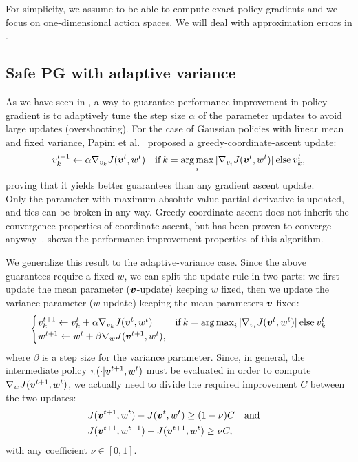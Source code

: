 For simplicity, we assume to be able to compute exact policy gradients and we focus on one-dimensional action spaces. We will deal with approximation errors in .

\subsection{Safe PG with adaptive variance}\label{sec:safe+explore}
As we have seen in , a way to guarantee performance improvement in policy gradient is to adaptively tune the step size $\alpha$ of the parameter updates to avoid large updates (overshooting). For the case of Gaussian policies with linear mean and fixed variance, Papini et al.~\cite{adaptive_batch} proposed a greedy-coordinate-ascent update:
\begin{align}\label{up:onlyv}
v_{k}^{t+1} \gets \alpha\gradJ[v_{k}]{\vv^t,w^t}
\quad \text{if}\:k =  \argmax_i |\gradJ[v_i]{\vv^t, w^t}| \:\text{else}\:v_{k}^t,
\end{align}
proving that it yields better guarantees than any gradient ascent update.\\
Only the parameter with maximum absolute-value partial derivative is updated, and ties can be broken in any way. Greedy coordinate ascent does not inherit the convergence properties of coordinate ascent, but has been proven to converge anyway~\cite{nutinicoordinate}.  shows the performance improvement properties of this algorithm.


We generalize this result to the adaptive-variance case. Since the above guarantees require a fixed $w$, we can split the update rule in two parts: we first update the mean parameter ($\vv$-update) keeping $w$ fixed, then we update the variance parameter ($w$-update) keeping the mean parameters $\vv$ fixed:
%
\begin{align}\label{eq:naive_update}
\begin{cases}
v_{k}^{t+1} \gets v_{k}^t + \alpha\gradJ[v_{k}]{\vv^t,w^t}
	& \text{if}\:k =  \argmax_i |\gradJ[v_i]{\vv^t, w^t}| \:\text{else}\:v_{k}^t\\
w^{t+1} \gets w^t + \beta\gradJ[w]{\vv^{t+1}, w^t},
\end{cases}
\end{align}
%
where $\beta$ is a step size for the variance parameter.
Since, in general, the intermediate policy $\pi(\cdot\vert\vv^{t+1},w^t)$ must be evaluated in order to compute $\gradJ[w]{\vv^{t+1},w^t}$, we actually need to divide the required improvement $C$ between the two updates:
%
\begin{align}%
&J(\vv^{t+1},w^t) - J(\vv^t,w^t) \geq (1-\nu) C \quad \text{and}\quad \label{eq:update-first} \\ 
&J(\vv^{t+1},w^{t+1}) - J(\vv^{t+1},w^t) \geq \nu C, \label{eq:update-second}
\end{align}
with any coefficient $\nu \in [0,1]$.

